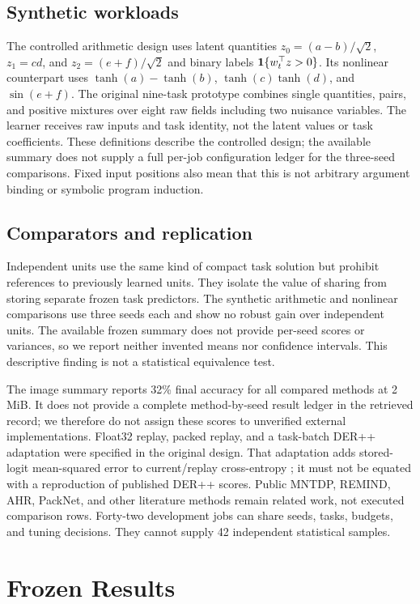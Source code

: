 \documentclass{article}
\begin{document}
\subsection{Synthetic workloads}
The controlled arithmetic design uses latent quantities $z_0=(a-b)/\sqrt{2}$, $z_1=cd$, and $z_2=(e+f)/\sqrt{2}$ and binary labels $\mathbf{1}\{w_t^\top z>0\}$. Its nonlinear counterpart uses $\tanh(a)-\tanh(b)$, $\tanh(c)\tanh(d)$, and $\sin(e+f)$. The original nine-task prototype combines single quantities, pairs, and positive mixtures over eight raw fields including two nuisance variables. The learner receives raw inputs and task identity, not the latent values or task coefficients. These definitions describe the controlled design; the available summary does not supply a full per-job configuration ledger for the three-seed comparisons. Fixed input positions also mean that this is not arbitrary argument binding or symbolic program induction.

\subsection{Comparators and replication}
Independent units use the same kind of compact task solution but prohibit references to previously learned units. They isolate the value of sharing from storing separate frozen task predictors. The synthetic arithmetic and nonlinear comparisons use three seeds each and show no robust gain over independent units. The available frozen summary does not provide per-seed scores or variances, so we report neither invented means nor confidence intervals. This descriptive finding is not a statistical equivalence test.

The image summary reports 32\% final accuracy for all compared methods at 2\,MiB. It does not provide a complete method-by-seed result ledger in the retrieved record; we therefore do not assign these scores to unverified external implementations. Float32 replay, packed replay, and a task-batch DER++ adaptation were specified in the original design. That adaptation adds stored-logit mean-squared error to current/replay cross-entropy \cite{buzzega2020}; it must not be equated with a reproduction of published DER++ scores. Public MNTDP, REMIND, AHR, PackNet, and other literature methods remain related work, not executed comparison rows. Forty-two development jobs can share seeds, tasks, budgets, and tuning decisions. They cannot supply 42 independent statistical samples.

\section{Frozen Results}
\label{sec:evaluation}
\end{document}
